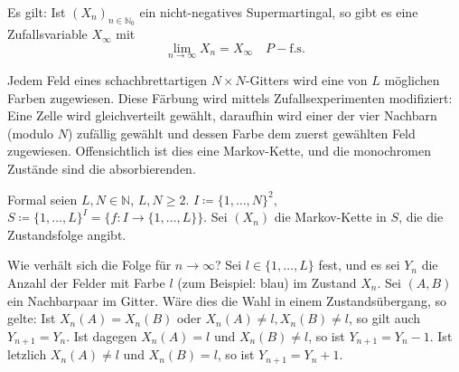 \documentclass[a4paper,twoside,DIV15,BCOR12mm]{scrbook}
\begin{document}
\begin{bemerkung}
Es gilt: Ist $(X_n)_{n\in\mathbb N_0}$ ein nicht-negatives Supermartingal, so gibt es eine Zufallsvariable $X_\infty$ mit 
\[
\lim_{n\to\infty} X_n = X_\infty \quad P-\text{f.s.}
\]
\end{bemerkung}

\begin{beispiel}
Jedem Feld eines schachbrettartigen $N\times N$-Gitters wird eine von $L$ möglichen Farben zugewiesen. Diese Färbung wird mittels Zufallsexperimenten modifiziert: Eine Zelle wird gleichverteilt gewählt, daraufhin wird einer der vier Nachbarn (modulo $N$) zufällig gewählt und dessen Farbe dem zuerst gewählten Feld zugewiesen. Offensichtlich ist dies eine Markov-Kette, und die monochromen Zustände sind die absorbierenden.

\begin{center}
\end{center}

Formal seien $L,N\in \mathbb N$, $L,N\ge 2$. $I\coloneqq\{1,\ldots,N\}^2$, $S\coloneqq \{1,\ldots,L\}^I = \{f:I\to \{1,\ldots,L\}\}$. Sei $(X_n)$ die Markov-Kette in $S$, die die Zustandsfolge angibt.

Wie verhält sich die Folge für $n\to\infty$? Sei $l\in\{1,\ldots,L\}$ fest, und es sei $Y_n$ die Anzahl der Felder mit Farbe $l$ (zum Beispiel: blau) im Zustand $X_n$. Sei $(A,B)$ ein Nachbarpaar im Gitter. Wäre dies die Wahl in einem Zustandsübergang, so gelte: Ist $X_n(A)=X_n(B)$ oder $X_n(A)\ne l, X_n(B)\ne l$, so gilt auch $Y_{n+1}=Y_n$. Ist dagegen $X_n(A)=l$ und $X_n(B)\ne l$, so ist $Y_{n+1}=Y_n-1$. Ist letzlich $X_n(A)\ne l$ und $X_n(B) =l$, so ist $Y_{n+1}=Y_n+1$.


\end{beispiel}
\end{document}
